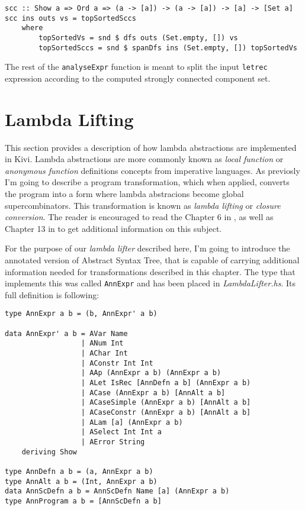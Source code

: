 \documentclass[a4paper]{report}
\begin{document}
\begin{lstlisting}
scc :: Show a => Ord a => (a -> [a]) -> (a -> [a]) -> [a] -> [Set a]
scc ins outs vs = topSortedSccs
    where
        topSortedVs = snd $ dfs outs (Set.empty, []) vs
        topSortedSccs = snd $ spanDfs ins (Set.empty, []) topSortedVs
\end{lstlisting}

The rest of the \texttt{analyseExpr} function is meant to split the input
\texttt{letrec} expression according to the computed strongly connected
component set.

\section{Lambda Lifting}
This section provides a description of how lambda abstractions are implemented
in Kivi. Lambda abstractions are more commonly known as \textit{local function}
or \textit{anonymous function} definitions concepts from imperative languages.
As previosly I'm going to describe a program transformation, which when
applied, converts the program into a form where lambda abstracions become
global supercombinators. This transformation is known as \textit{lambda
lifting} or \textit{closure conversion}. The reader is encouraged to read the
Chapter 6 in \cite{joneslester00}, as well as Chapter 13 in \cite{jones87} to
get additional information on this subject.

For the purpose of our \textit{lambda lifter} described here, I'm going to
introduce the annotated version of Abstract Syntax Tree, that is capable of
carrying additional information needed for transformations described in this
chapter. The type that implements this was called \texttt{AnnExpr} and has
been placed in \textit{LambdaLifter.hs}. Its full definition is following:

\begin{lstlisting}[label=lst:annotated_expression]
type AnnExpr a b = (b, AnnExpr' a b)

data AnnExpr' a b = AVar Name
                  | ANum Int
                  | AChar Int
                  | AConstr Int Int
                  | AAp (AnnExpr a b) (AnnExpr a b)
                  | ALet IsRec [AnnDefn a b] (AnnExpr a b)
                  | ACase (AnnExpr a b) [AnnAlt a b]
                  | ACaseSimple (AnnExpr a b) [AnnAlt a b]
                  | ACaseConstr (AnnExpr a b) [AnnAlt a b]
                  | ALam [a] (AnnExpr a b)
                  | ASelect Int Int a
                  | AError String
    deriving Show

type AnnDefn a b = (a, AnnExpr a b)
type AnnAlt a b = (Int, AnnExpr a b)
data AnnScDefn a b = AnnScDefn Name [a] (AnnExpr a b)
type AnnProgram a b = [AnnScDefn a b]
\end{lstlisting}
\end{document}
